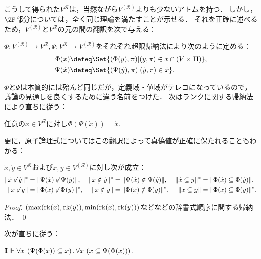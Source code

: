\documentclass[realisability.tex]{subfiles}
\begin{document}
こうして得られた$V^{\mathcal{R}}$は，当然ながら$V^{(\mathcal{R})}$よりも少ないアトムを持つ．
しかし，$\ZF$部分については，全く同じ理論を満たすことが示せる．
それを正確に述べるため，$V^{(\mathcal{R})}$と$V^{\mathcal{R}}$の元の間の翻訳を次で与える：
\begin{definition}
 $\Phi: V^{(\mathcal{R})} \to V^{\mathcal{R}}, \Psi: V^{\mathcal{R}} \to V^{(\mathcal{R})}$をそれぞれ超限帰納法により次のように定める：
 \begin{align*}
  \Phi(x) &\defeq \Set{ (\Phi(y), \pi) | (y, \pi) \in x \cap (V \times \Pi)},\\
  \Psi(\dot{x}) &\defeq \Set{ (\Psi(\dot{y}), \pi) | (\dot{y}, \pi) \in \dot{x}}.
 \end{align*}
\end{definition}
$\Phi$と$\Psi$は本質的には殆んど同じだが，定義域・値域がテレコになっているので，議論の見通しを良くするために違う名前をつけた．
次はランクに関する帰納法により直ちに従う：
\begin{lemma}\label{lem:phi-of-psi-inv}
 任意の$\dot{x} \in V^{\mathcal{R}}$に対し$\Phi(\Psi(\dot{x})) = \dot{x}$.
\end{lemma}
更に，原子論理式についてはこの翻訳によって真偽値が正確に保たれることもわかる：
\begin{lemma}\label{lem:atomic-coinc}
 $\dot{x}, \dot{y} \in V^{\mathcal{R}}$および$x, y \in V^{(\mathcal{R})}$に対し次が成立：
 \begin{align*}
  \|\dot{x} \not\mathrel{\varepsilon} \dot{y}\|^*   &= \|\Psi(\dot{x}) \not\mathrel{\varepsilon} \Psi(\dot{y})\|, &
  \|\dot{x} \notin \dot{y}\|^*    &= \|\Psi(\dot{x}) \notin \Psi(\dot{y})\|, &
  \|\dot{x} \subseteq \dot{y}\|^* &= \|\Phi(\dot{x}) \subseteq \Phi(\dot{y})\|, \\
  \|x \not\mathrel{\varepsilon} y\|   &= \|\Phi(x) \not\mathrel{\varepsilon} \Phi(y)\|^*, &
  \|x \notin y\|    &= \|\Phi(x) \notin \Phi(y)\|^*, &
  \|x \subseteq y\| &= \|\Phi(x) \subseteq \Phi(y)\|^*.
 \end{align*}
\end{lemma}
\begin{proof}
 $(\max(\operatorname{rk}(x), \operatorname{rk}(y)), \min(\operatorname{rk}(x), \operatorname{rk}(y)))$などなどの辞書式順序に関する帰納法． \qed
\end{proof}
次が直ちに従う：
\begin{corollary}\label{cor:psi-of-phi-ext-eq}
 $\mathsf{\mathbf{I}} \Vdash \forall x \: \left(\Psi(\Phi(x)) \subseteq x\right),
  \forall x \: \left(x \subseteq \Psi(\Phi(x)) \right)$.
\end{corollary}
\end{document}
